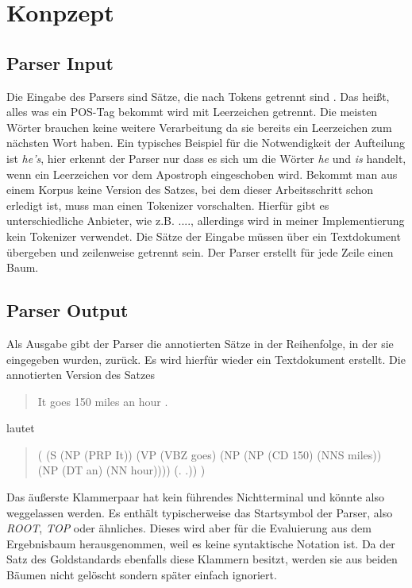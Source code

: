 %
\chapter{Konpzept}
\label{sec:konzept}

\section{Parser Input}

Die Eingabe des Parsers sind Sätze, die nach Tokens getrennt sind . Das heißt, alles was ein POS-Tag bekommt wird mit Leerzeichen getrennt. Die meisten Wörter brauchen keine weitere Verarbeitung da sie bereits ein Leerzeichen zum nächsten Wort haben. Ein typisches Beispiel für die Notwendigkeit der Aufteilung ist \textit{he's}, hier erkennt der Parser nur dass es sich um die Wörter \textit{he} und \textit{is} handelt, wenn ein Leerzeichen vor dem Apostroph eingeschoben wird. Bekommt man aus einem Korpus keine Version des Satzes, bei dem dieser Arbeitsschritt schon erledigt ist, muss man einen Tokenizer vorschalten. Hierfür gibt es unterschiedliche Anbieter, wie z.B. ...., %
allerdings wird in meiner Implementierung kein Tokenizer verwendet. Die Sätze der Eingabe müssen über ein Textdokument übergeben und zeilenweise getrennt sein. Der Parser erstellt für jede Zeile einen Baum.

\section{Parser Output}
Als Ausgabe gibt der Parser die annotierten Sätze in der Reihenfolge, in der sie eingegeben wurden, zurück. Es wird hierfür wieder ein Textdokument erstellt.%
Die annotierten Version des Satzes
\begin{quote}
It goes 150 miles an hour .
\end{quote}
lautet
\begin{quote}
( (S (NP (PRP It)) (VP (VBZ goes) (NP (NP (CD 150) (NNS miles)) \\(NP (DT an) (NN hour)))) (. .)) )
\end{quote}
Das äußerste Klammerpaar hat kein führendes Nichtterminal und könnte also weggelassen werden. Es enthält typischerweise das Startsymbol der Parser, also \textit{ROOT}, \textit{TOP} oder ähnliches. Dieses wird aber für die Evaluierung aus dem Ergebnisbaum herausgenommen, weil es keine syntaktische Notation ist. Da der Satz des Goldstandards ebenfalls diese Klammern besitzt, werden sie aus beiden Bäumen nicht gelöscht sondern später einfach ignoriert.
